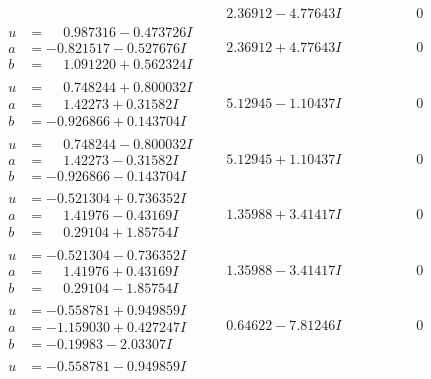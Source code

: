 \documentclass[1p]{elsarticle_modified}
\theoremstyle{definition}
\begin{document}
$$\begin{array}{c|c|c}
 & \phantom{-}2.36912 - 4.77643 I & \phantom{-0.000000 } 0 \\ \hline\begin{aligned}
u &= \phantom{-}0.987316 - 0.473726 I \\
a &= -0.821517 - 0.527676 I \\
b &= \phantom{-}1.091220 + 0.562324 I\end{aligned}
 & \phantom{-}2.36912 + 4.77643 I & \phantom{-0.000000 } 0 \\ \hline\begin{aligned}
u &= \phantom{-}0.748244 + 0.800032 I \\
a &= \phantom{-}1.42273 + 0.31582 I \\
b &= -0.926866 + 0.143704 I\end{aligned}
 & \phantom{-}5.12945 - 1.10437 I & \phantom{-0.000000 } 0 \\ \hline\begin{aligned}
u &= \phantom{-}0.748244 - 0.800032 I \\
a &= \phantom{-}1.42273 - 0.31582 I \\
b &= -0.926866 - 0.143704 I\end{aligned}
 & \phantom{-}5.12945 + 1.10437 I & \phantom{-0.000000 } 0 \\ \hline\begin{aligned}
u &= -0.521304 + 0.736352 I \\
a &= \phantom{-}1.41976 - 0.43169 I \\
b &= \phantom{-}0.29104 + 1.85754 I\end{aligned}
 & \phantom{-}1.35988 + 3.41417 I & \phantom{-0.000000 } 0 \\ \hline\begin{aligned}
u &= -0.521304 - 0.736352 I \\
a &= \phantom{-}1.41976 + 0.43169 I \\
b &= \phantom{-}0.29104 - 1.85754 I\end{aligned}
 & \phantom{-}1.35988 - 3.41417 I & \phantom{-0.000000 } 0 \\ \hline\begin{aligned}
u &= -0.558781 + 0.949859 I \\
a &= -1.159030 + 0.427247 I \\
b &= -0.19983 - 2.03307 I\end{aligned}
 & \phantom{-}0.64622 - 7.81246 I & \phantom{-0.000000 } 0 \\ \hline\begin{aligned}
u &= -0.558781 - 0.949859 I \\

\end{aligned}
\end{array}$$
\end{document}
